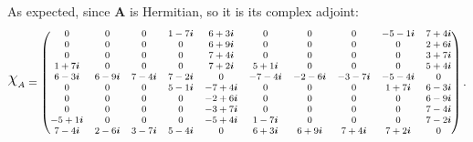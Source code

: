 As expected, since $ \mathbf{A}$ is Hermitian, so it is its complex adjoint:
\begin{equation*}
    \footnotesize
    \rchi_A =
    \begin{pmatrix}
        0         & 0        & 0        & 1 -7 \qi & 6 +3 \qi  & 0         & 0         & 0         & -5 -1 \qi & 7 +4 \qi \\
        0         & 0        & 0        & 0        & 6 +9 \qi  & 0         & 0         & 0         & 0         & 2 +6 \qi \\
        0         & 0        & 0        & 0        & 7 +4 \qi  & 0         & 0         & 0         & 0         & 3 +7 \qi \\
        1 +7 \qi  & 0        & 0        & 0        & 7 +2 \qi  & 5 +1 \qi  & 0         & 0         & 0         & 5 +4 \qi \\
        6 -3 \qi  & 6 -9 \qi & 7 -4 \qi & 7 -2 \qi & 0         & -7 -4 \qi & -2 -6 \qi & -3 -7 \qi & -5 -4 \qi & 0        \\
        0         & 0        & 0        & 5 -1 \qi & -7 +4 \qi & 0         & 0         & 0         & 1 +7 \qi  & 6 -3 \qi \\
        0         & 0        & 0        & 0        & -2 +6 \qi & 0         & 0         & 0         & 0         & 6 -9 \qi \\
        0         & 0        & 0        & 0        & -3 +7 \qi & 0         & 0         & 0         & 0         & 7 -4 \qi \\
        -5 +1 \qi & 0        & 0        & 0        & -5 +4 \qi & 1 -7 \qi  & 0         & 0         & 0         & 7 -2 \qi \\
        7 -4 \qi  & 2 -6 \qi & 3 -7 \qi & 5 -4 \qi & 0         & 6 +3 \qi  & 6 +9 \qi  & 7 +4 \qi  & 7 +2 \qi  & 0
    \end{pmatrix}.
\end{equation*}

